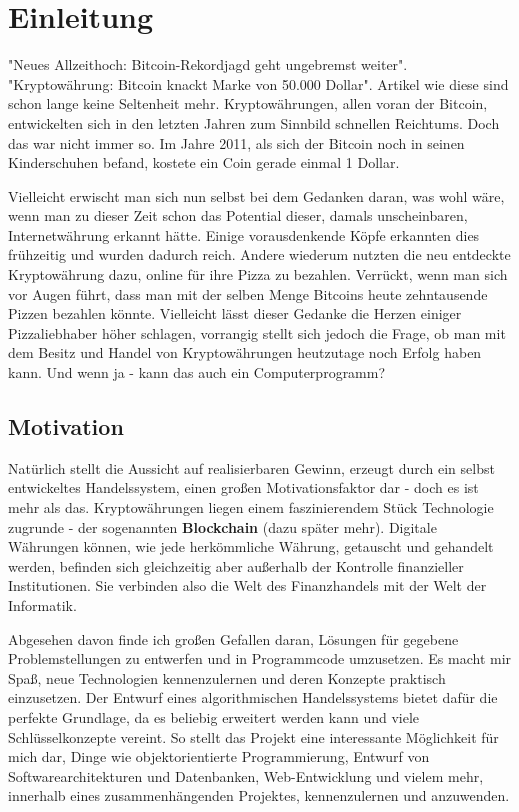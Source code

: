 \documentclass[oneside]{ausarbeitung}
\begin{document}
\cleardoublepage
{}
\setcounter{page}{1}

\chapter{Einleitung}
\label{cha:einleitung}

"Neues Allzeithoch: Bitcoin-Rekordjagd geht ungebremst
weiter"\cite{bitcoin_artikel_1}. "Kryptowährung: Bitcoin knackt Marke
von 50.000 Dollar"\cite{bitcoin_artikel_2}. Artikel wie diese sind
schon lange keine Seltenheit mehr. Kryptowährungen, allen voran der
Bitcoin, entwickelten sich in den letzten Jahren zum Sinnbild
schnellen Reichtums. Doch das war nicht immer so. Im Jahre 2011, als
sich der Bitcoin noch in seinen Kinderschuhen befand, kostete ein Coin
gerade einmal 1 Dollar\cite{bitcoin_kurs_2011}. 

Vielleicht erwischt
man sich nun selbst bei dem Gedanken daran, was wohl wäre, wenn man
zu dieser Zeit schon das Potential dieser, damals unscheinbaren,
Internetwährung erkannt hätte. Einige vorausdenkende Köpfe
erkannten dies frühzeitig und wurden dadurch reich. Andere wiederum
nutzten die neu entdeckte Kryptowährung dazu, online für ihre Pizza
zu bezahlen. Verrückt, wenn man sich vor Augen führt, dass man mit
der selben Menge Bitcoins heute zehntausende Pizzen bezahlen könnte.
Vielleicht lässt dieser Gedanke die Herzen einiger Pizzaliebhaber
höher schlagen, vorrangig stellt sich jedoch die Frage, ob man mit
dem Besitz und Handel von Kryptowährungen heutzutage noch Erfolg
haben kann. Und wenn ja - kann das auch ein Computerprogramm?


\section{Motivation}
\label{sec:motivation}

Natürlich stellt die Aussicht auf realisierbaren Gewinn, erzeugt
durch ein selbst entwickeltes Handelssystem, einen großen
Motivationsfaktor dar - doch es ist mehr als das. Kryptowährungen
liegen einem faszinierendem Stück Technologie zugrunde - der
sogenannten \textbf{Blockchain} (dazu später mehr). Digitale Währungen 
können, wie jede herkömmliche Währung, getauscht und
gehandelt werden, befinden sich gleichzeitig aber außerhalb der
Kontrolle finanzieller Institutionen. Sie verbinden also
die Welt des Finanzhandels mit der Welt der Informatik. 

Abgesehen davon finde ich großen Gefallen daran, Lösungen für
gegebene Problemstellungen zu entwerfen und in Programmcode
umzusetzen. Es macht mir Spaß, neue Technologien kennenzulernen und
deren Konzepte praktisch einzusetzen. Der Entwurf eines
algorithmischen Handelssystems bietet dafür die perfekte Grundlage,
da es beliebig erweitert werden kann und viele Schlüsselkonzepte
vereint. So stellt das Projekt eine interessante Möglichkeit für
mich dar, Dinge wie objektorientierte Programmierung, Entwurf von
Softwarearchitekturen und Datenbanken, Web-Entwicklung und vielem
mehr, innerhalb eines zusammenhängenden Projektes, kennenzulernen und
anzuwenden.
\end{document}
